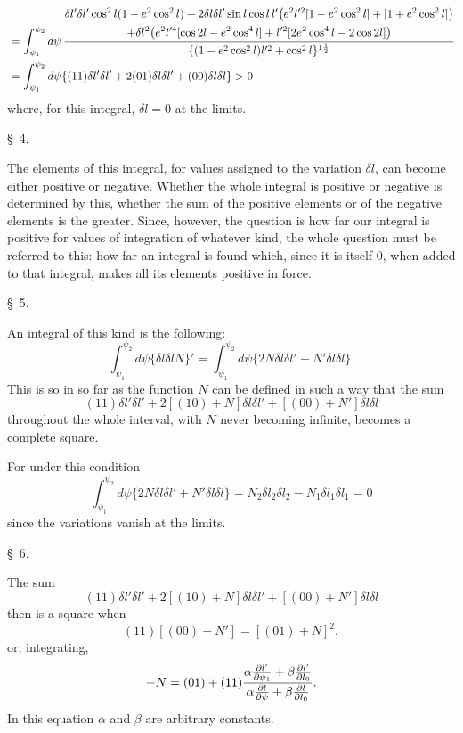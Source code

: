 \[
\begin{aligned}
&=\int_{\psi_1}^{\psi_2}d\psi\,
{\begin{gathered}
\delta l'\delta l'\cos^2l(1-e^2\cos^2l)
+2\delta l\delta l'\sin l\cos l\,l'\bigl(e^2l'^2[1-e^2\cos^2l]+[1+e^2\cos^2l]\bigr)\\
+\delta l^2\bigl(e^2l'^4[\cos2l-e^2\cos^4l]+l'^2[2e^2\cos^4l-2\cos2l]\bigr)
\end{gathered}
\over \{(1-e^2\cos^2l)l'^2+\cos^2l\}^{1\frac12}}\\
&=\int_{\psi_1}^{\psi_2}d\psi\{(11)\delta l'\delta l'+2(01)\delta l\delta l'+(00)\delta l\delta l\}>0
\end{aligned}
\]
where, for this integral, $\delta l=0$ at the limits.

\begin{center}\S\ 4.\end{center}

The elements of this integral, for values assigned to the variation $\delta l$, can become either positive or negative. Whether the whole integral is positive or negative is determined by this, whether the sum of the positive elements or of the negative elements is the greater. Since, however, the question is how far our integral is positive for values of integration of whatever kind, the whole question must be referred to this: how far an integral is found which, since it is itself $0$, when added to that integral, makes all its elements positive in force.

\begin{center}\S\ 5.\end{center}

An integral of this kind is the following:
\[
 \int_{\psi_1}^{\psi_2}d\psi\{\delta l\delta l N\}'=
 \int_{\psi_1}^{\psi_2}d\psi\{2N\delta l\delta l'+N'\delta l\delta l\}.
\]
This is so in so far as the function $N$ can be defined in such a way that the sum
\[
 (11)\delta l'\delta l'+2[(10)+N]\delta l\delta l'+[(00)+N']\delta l\delta l
\]
throughout the whole interval, with $N$ never becoming infinite, becomes a complete square.

For under this condition
\[
 \int_{\psi_1}^{\psi_2}d\psi\{2N\delta l\delta l'+N'\delta l\delta l\}=N_2\delta l_2\delta l_2-N_1\delta l_1\delta l_1=0
\]
since the variations vanish at the limits.

\begin{center}\S\ 6.\end{center}

The sum
\[
 (11)\delta l'\delta l'+2[(10)+N]\delta l\delta l'+[(00)+N']\delta l\delta l
\]
then is a square when
\[
 (11)[(00)+N']=[(01)+N]^2,
\]
or, integrating,
\[
 -N=(01)+(11){\alpha {\partial l'\over\partial\psi_1}+\beta {\partial l'\over\partial l_0}
 \over \alpha {\partial l\over\partial\psi}+\beta {\partial l\over\partial l_0}}.
\]
In this equation $\alpha$ and $\beta$ are arbitrary constants.



